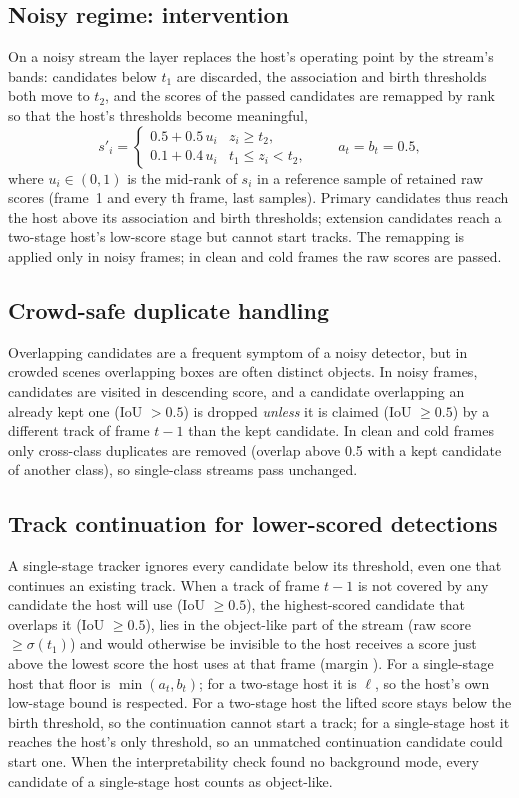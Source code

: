 \documentclass[pdflatex,sn-mathphys-num]{sn-jnl}
\begin{document}
\subsection{Noisy regime: intervention}\label{sec:noisy}
On a noisy stream the layer replaces the host's operating point by the stream's bands: candidates below $t_1$ are discarded, the association and birth thresholds both move to $t_2$, and the scores of the passed candidates are remapped by rank so that the host's thresholds become meaningful,
\begin{equation}
s'_i=\begin{cases}0.5+0.5\,u_i & z_i\ge t_2,\\ 0.1+0.4\,u_i & t_1\le z_i<t_2,\end{cases}\qquad a_t=b_t=0.5,
\end{equation}
where $u_i\in(0,1)$ is the mid-rank of $s_i$ in a reference sample of retained raw scores (frame~1 and every th frame, last  samples). Primary candidates thus reach the host above its association and birth thresholds; extension candidates reach a two-stage host's low-score stage but cannot start tracks. The remapping is applied only in noisy frames; in clean and cold frames the raw scores are passed.

\subsection{Crowd-safe duplicate handling}\label{sec:dup}
Overlapping candidates are a frequent symptom of a noisy detector, but in crowded scenes overlapping boxes are often distinct objects. In noisy frames, candidates are visited in descending score, and a candidate overlapping an already kept one (IoU $>0.5$) is dropped \emph{unless} it is claimed (IoU $\ge 0.5$) by a different track of frame $t-1$ than the kept candidate. In clean and cold frames only cross-class duplicates are removed (overlap above 0.5 with a kept candidate of another class), so single-class streams pass unchanged.

\subsection{Track continuation for lower-scored detections}\label{sec:rescue}
A single-stage tracker ignores every candidate below its threshold, even one that continues an existing track. When a track of frame $t-1$ is not covered by any candidate the host will use (IoU $\ge 0.5$), the highest-scored candidate that overlaps it (IoU $\ge 0.5$), lies in the object-like part of the stream (raw score $\ge\sigma(t_1)$) and would otherwise be invisible to the host receives a score just above the lowest score the host uses at that frame (margin ). For a single-stage host that floor is $\min(a_t,b_t)$; for a two-stage host it is $\ell$, so the host's own low-stage bound is respected. For a two-stage host the lifted score stays below the birth threshold, so the continuation cannot start a track; for a single-stage host it reaches the host's only threshold, so an unmatched continuation candidate could start one. When the interpretability check found no background mode, every candidate of a single-stage host counts as object-like.
\end{document}
